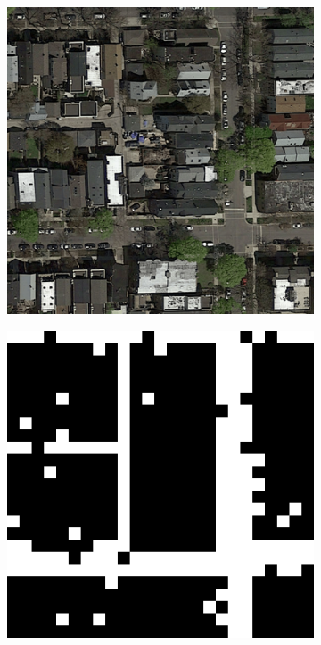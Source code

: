 \documentclass[10pt,conference,compsocconf]{IEEEtran}
\begin{document}
\begin{figure}[ht]
    \centering
    
    \begin{subfigure}{0.20\textwidth}
        \centering
        \includegraphics[width=0.9\linewidth]{doc/images/perfect_input.png}
    \end{subfigure}
    \begin{subfigure}{0.20\linewidth}
        \centering
        \includegraphics[width=0.9\linewidth]{doc/images/perfect_cnn.png}

\end{subfigure}
\end{figure}
\end{document}
